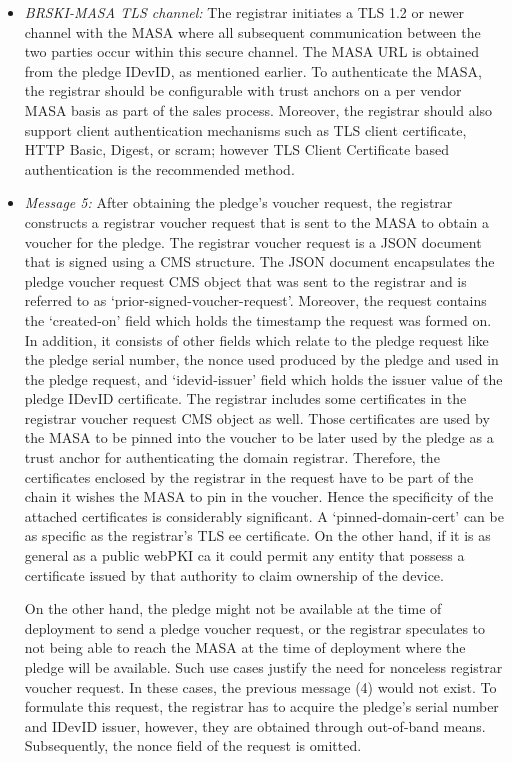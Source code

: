 \begin{itemize}
	\item \textit{BRSKI-MASA TLS channel:} The registrar initiates a TLS 1.2 or newer channel with the MASA where all subsequent communication between the two parties occur within this secure channel. The MASA URL is obtained from the pledge IDevID, as mentioned earlier. To authenticate the MASA, the registrar should be configurable with trust anchors on a per vendor MASA basis as part of the sales process. Moreover, the registrar should also support client authentication mechanisms such as TLS client certificate, HTTP Basic, Digest, or \gls{scram}; however TLS Client Certificate based authentication is the recommended method.
	
	\item \textit{Message 5:} After obtaining the pledge's voucher request, the registrar constructs a registrar voucher request that is sent to the MASA to obtain a voucher for the pledge. The registrar voucher request is a JSON document that is signed using a CMS structure. The JSON document encapsulates the pledge voucher request CMS object that was sent to the registrar and is referred to as `prior-signed-voucher-request'. Moreover, the request contains the `created-on' field which holds the timestamp the request was formed on. In addition, it consists of other fields which relate to the pledge request like the pledge serial number, the nonce used produced by the pledge and used in the pledge request, and `idevid-issuer' field which holds the issuer value of the pledge IDevID certificate. The registrar includes some certificates in the registrar voucher request CMS object as well. Those certificates are used by the MASA to be pinned into the voucher to be later used by the pledge as a trust anchor for authenticating the domain registrar. Therefore, the certificates enclosed by the registrar in the request have to be part of the chain it wishes the MASA to pin in the voucher. Hence the specificity of the attached certificates is considerably significant. A `pinned-domain-cert' can be as specific as the registrar's TLS \gls{ee} certificate. On the other hand, if it is as general as a public webPKI \gls{ca} it could permit any entity that possess a certificate issued by that authority to claim ownership of the device.
	\par
	On the other hand, the pledge might not be available at the time of deployment to send a pledge voucher request, or the registrar speculates to not being able to reach the MASA at the time of deployment where the pledge will be available. Such use cases justify the need for nonceless registrar voucher request. In these cases, the previous message (4) would not exist. To formulate this request, the registrar has to acquire the pledge's serial number and IDevID issuer, however, they are obtained through out-of-band means. Subsequently, the nonce field of the request is omitted.
	

\end{itemize}
